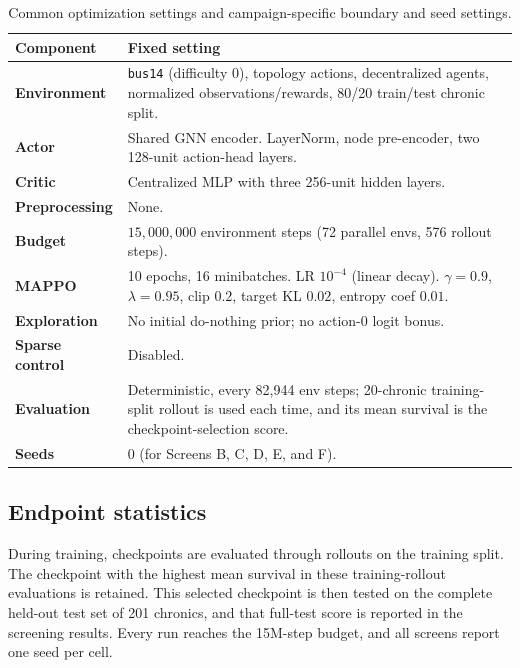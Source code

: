 \begin{table}[H]
  \centering
  \small
  \caption{Common optimization settings and campaign-specific boundary and
  seed settings.}
  \label{tab:screening-common-settings}
  \setlength{\tabcolsep}{4pt}
  \begin{tabular}{L{0.22\textwidth}L{0.73\textwidth}}
    \toprule
    \textbf{Component} & \textbf{Fixed setting} \\
    \midrule
    \textbf{Environment} & \texttt{bus14} (difficulty 0), topology actions, decentralized agents, normalized observations/rewards, 80/20 train/test chronic split. \\
    \textbf{Actor} & Shared GNN encoder. LayerNorm, node pre-encoder, two 128-unit action-head layers. \\
    \textbf{Critic} & Centralized MLP with three 256-unit hidden layers. \\
    \textbf{Preprocessing} & None. \\
    \textbf{Budget} & $15{,}000{,}000$ environment steps (72 parallel envs, 576 rollout steps). \\
    \textbf{MAPPO} & 10 epochs, 16 minibatches. LR $10^{-4}$ (linear decay). $\gamma=0.9$, $\lambda=0.95$, clip $0.2$, target KL $0.02$, entropy coef $0.01$. \\
    \textbf{Exploration} & No initial do-nothing prior; no action-0 logit bonus. \\
    \textbf{Sparse control} & Disabled. \\
    \textbf{Evaluation} & Deterministic, every 82{,}944 env steps; 20-chronic training-split rollout is used each time, and its mean survival is the checkpoint-selection score. \\
    \textbf{Seeds} & 0 (for Screens B, C, D, E, and F). \\
    \bottomrule
  \end{tabular}
\end{table}

\subsection{Endpoint statistics}
\label{subsec:screening-endpoint-statistics}

During training, checkpoints are evaluated through rollouts on
the training split. The checkpoint with the highest mean survival in these
training-rollout evaluations is retained. This selected checkpoint is then
tested on the complete held-out test set of 201 chronics, and that full-test
score is reported in the screening results. Every run reaches the 15M-step
budget, and all screens report one seed per cell.

